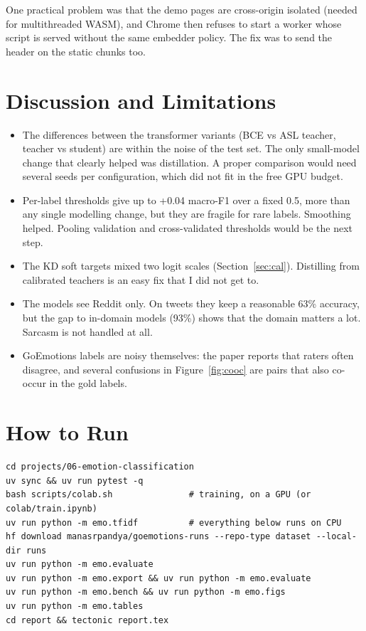 \documentclass[11pt,a4paper]{article}
\begin{document}
One practical problem was that the demo pages are cross-origin isolated (needed for multithreaded WASM), and
Chrome then refuses to start a worker whose script is served without the same embedder policy. The fix was to
send the header on the static chunks too.

\section{Discussion and Limitations}

\begin{itemize}
\itemsep0.2em
\item The differences between the transformer variants (BCE vs ASL teacher, teacher vs student) are within
the noise of the test set. The only small-model change that clearly helped was distillation. A proper
comparison would need several seeds per configuration, which did not fit in the free GPU budget.
\item Per-label thresholds give up to +0.04 macro-F1 over a fixed 0.5, more than any single modelling
change, but they are fragile for rare labels. Smoothing helped. Pooling validation and cross-validated
thresholds would be the next step.
\item The KD soft targets mixed two logit scales (Section~\ref{sec:cal}). Distilling from calibrated teachers is an easy
fix that I did not get to.
\item The models see Reddit only. On tweets they keep a reasonable 63\% accuracy, but the gap to in-domain
models (93\%) shows that the domain matters a lot. Sarcasm is not handled at all.
\item GoEmotions labels are noisy themselves: the paper reports that raters often disagree, and several
confusions in Figure~\ref{fig:cooc} are pairs that also co-occur in the gold labels.
\end{itemize}

\section{How to Run}

\begin{verbatim}
cd projects/06-emotion-classification
uv sync && uv run pytest -q
bash scripts/colab.sh               # training, on a GPU (or colab/train.ipynb)
uv run python -m emo.tfidf          # everything below runs on CPU
hf download manasrpandya/goemotions-runs --repo-type dataset --local-dir runs
uv run python -m emo.evaluate
uv run python -m emo.export && uv run python -m emo.evaluate
uv run python -m emo.bench && uv run python -m emo.figs
uv run python -m emo.tables
cd report && tectonic report.tex
\end{verbatim}
\end{document}
